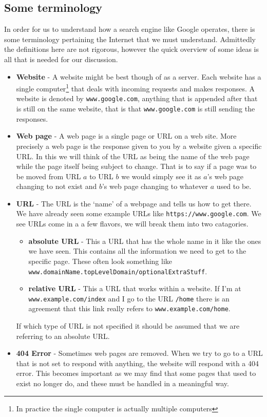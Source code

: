 \documentclass{article}
\begin{document}
	
	\subsection{Some terminology}
	In order for us to understand how a search engine like Google operates, there is some terminology pertaining the Internet that we must understand. Admittedly the definitions here are not rigorous, however the quick overview of some ideas is all that is needed for our discussion.
	\begin{itemize}
		
		\item \textbf{Website} - A website might be best though of as a server. Each website has a single computer\footnote{In practice the single computer is actually multiple computers} that deals with incoming requests and makes responses. A website is denoted by \verb|www.google.com|, anything that is appended after that is still on the same website, that is that \verb|www.google.com| is still sending the responses. 
		
		\item \textbf{Web page} - A web page is a single page or URL on a web site. More precisely a web page is the response given to you by a website given a specific URL. In this we will think of the URL as being the name of the web page while the page itself being subject to change. That is to say if a page was to be moved from  URL $a$ to URL $b$ we would simply see it as $a$'s web page changing to not exist and $b$'s web page changing to whatever $a$ used to be.
		
		\item \textbf{URL} - The URL is the `name' of a webpage and tells us how to get there. We have already seen some example URLs like \verb|https://www.google.com|. We see URLs come in a a few flavors, we will break them into two catagories.
		\begin{itemize}
			\item \textbf{absolute URL} - This a URL that has the whole name in it like the ones we have seen. This contains all the information we need to get to the specific page. These often look something like \verb|www.domainName.topLevelDomain/optionalExtraStuff|.
			\item \textbf{relative URL} - This a URL that works within a website. If I'm at \verb|www.example.com/index| and I go to the URL \verb|/home| there is an agreement that this link really refers to \verb|www.example.com/home|.
		\end{itemize}
		If which type of URL is not specified it should be assumed that we are referring to an absolute URL.
		
		\item \textbf{404 Error} - Sometimes web pages are removed. When we try to go to a URL that is not set to respond with anything, the website will respond with a 404 error. This becomes important as we may find that some pages that used to exist no longer do, and these must be handled in a meaningful way.
		
		
	\end{itemize}
	
\end{document}
